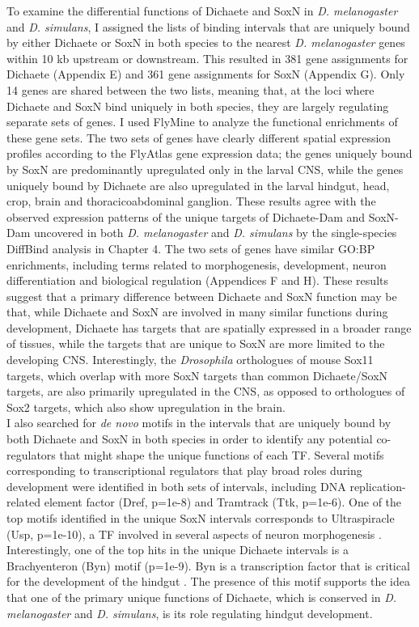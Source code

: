 To examine the differential functions of Dichaete and SoxN in \emph{D. melanogaster} and \emph{D. simulans}, I assigned the lists of binding intervals that are uniquely bound by either Dichaete or SoxN in both species to the nearest \emph{D. melanogaster} genes within 10 kb upstream or downstream. This resulted in 381 gene assignments for Dichaete (Appendix E) and 361 gene assignments for SoxN (Appendix G). Only 14 genes are shared between the two lists, meaning that, at the loci where Dichaete and SoxN bind uniquely in both species, they are largely regulating separate sets of genes. I used FlyMine to analyze the functional enrichments of these gene sets. The two sets of genes have clearly different spatial expression profiles according to the FlyAtlas gene expression data; the genes uniquely bound by SoxN are predominantly upregulated only in the larval CNS, while the genes uniquely bound by Dichaete are also upregulated in the larval hindgut, head, crop, brain and thoracicoabdominal ganglion. These results agree with the observed expression patterns of the unique targets of Dichaete-Dam and SoxN-Dam uncovered in both \emph{D. melanogaster} and \emph{D. simulans} by the single-species DiffBind analysis in Chapter 4. The two sets of genes have similar GO:BP enrichments, including terms related to morphogenesis, development, neuron differentiation and biological regulation (Appendices F and H). These results suggest that a primary difference between Dichaete and SoxN function may be that, while Dichaete and SoxN are involved in many similar functions during development, Dichaete has targets that are spatially expressed in a broader range of tissues, while the targets that are unique to SoxN are more limited to the developing CNS. Interestingly, the \emph{Drosophila} orthologues of mouse Sox11 targets, which overlap with more SoxN targets than common Dichaete/SoxN targets, are also primarily upregulated in the CNS, as opposed to orthologues of Sox2 targets, which also show upregulation in the brain.\\

I also searched for \emph{de novo} motifs in the intervals that are uniquely bound by both Dichaete and SoxN in both species in order to identify any potential co-regulators that might shape the unique functions of each TF. Several motifs corresponding to transcriptional regulators that play broad roles during development were identified in both sets of intervals, including DNA replication-related element factor (Dref, p=1e-8) and Tramtrack (Ttk, p=1e-6). One of the top motifs identified in the unique SoxN intervals corresponds to Ultraspiracle (Usp, p=1e-10), a TF involved in several aspects of neuron morphogenesis \citep{lee_cell-autonomous_????,parrish_genome-wide_2006}. Interestingly, one of the top hits in the unique Dichaete intervals is a Brachyenteron (Byn) motif (p=1e-9). Byn is a transcription factor that is critical for the development of the hindgut \citep{kispert_homologs_1994,murakami_developmental_1999}. The presence of this motif supports the idea that one of the primary unique functions of Dichaete, which is conserved in \emph{D. melanogaster} and \emph{D. simulans}, is its role regulating hindgut development.\\


